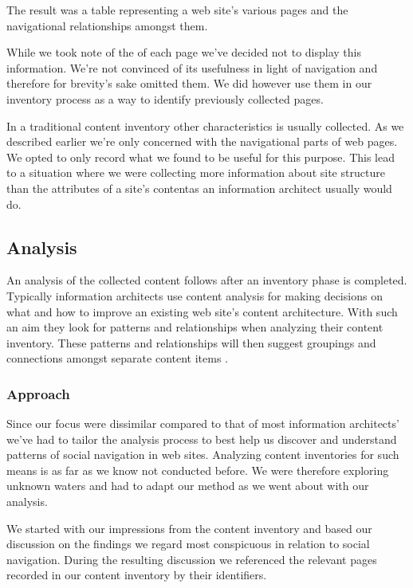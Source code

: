 The result was a table representing a web site's various pages and the
navigational relationships amongst them.

While we took note of the  of each page we've decided not to display
this information. We're not convinced of its usefulness in light of
navigation and therefore for brevity's sake omitted them. We did however use
them in our inventory process as a way to identify previously collected pages.

In a traditional content inventory other characteristics
is usually collected.%
As we described earlier we're only concerned with the navigational parts of
web pages. We opted to only record what we found to be useful for this
purpose. This lead to a situation where we were collecting more information
about site structure than the attributes of a site's content\dash{}as an
information architect usually would do.

\subsection{Analysis}

An analysis of the collected content follows after an inventory phase is
completed. Typically information architects use content analysis for
making decisions on what and how to improve an existing web site's content
architecture. With such an aim they look for patterns and relationships when
analyzing their content inventory. These patterns and relationships will then
suggest groupings and connections amongst separate content items
\cite[]{morville06}.

\subsubsection{Approach}
Since our focus were dissimilar compared to that of most information
architects' we've had to tailor the analysis process to best help us discover
and understand patterns of social navigation in web sites. Analyzing content
inventories for such means is as far as we know not conducted before. We were
therefore exploring unknown waters and had to adapt our method as we
went about with our analysis.

We started with our impressions from the content inventory%
and based our discussion on the findings we regard most conspicuous in
relation to social navigation. During the resulting discussion we
referenced the relevant pages recorded in our content inventory by their
identifiers.

